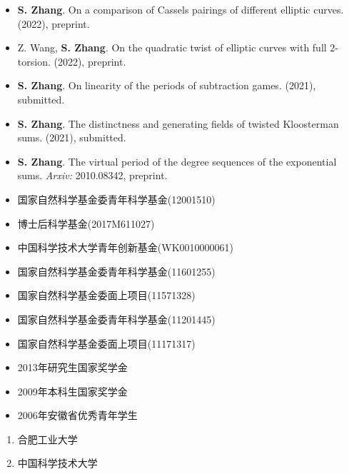 \documentclass[11pt,a4paper]{article}
\begin{document}
\begin{itemize}
\item \textbf{S. Zhang}.
On a comparison of Cassels pairings of different elliptic curves.
(2022), preprint.

\item Z. Wang, \textbf{S. Zhang}.
On the quadratic twist of elliptic curves with full $2$-torsion.
(2022), preprint.

\item \textbf{S. Zhang}.
On linearity of the periods of subtraction games.
(2021), submitted.

\item \textbf{S. Zhang}.
The distinctness and generating fields of twisted Kloosterman sums.
(2021), submitted.

\item \textbf{S. Zhang}.
The virtual period of the degree sequences of the exponential sums.
{\em Arxiv:} 2010.08342, preprint.
\end{itemize}


\begin{itemize}
\item 国家自然科学基金委青年科学基金(12001510)
\item 博士后科学基金(2017M611027)
\end{itemize}


\begin{itemize}
\item 中国科学技术大学青年创新基金(WK0010000061)
\item 国家自然科学基金委青年科学基金(11601255)
\item 国家自然科学基金委面上项目(11571328)
\item 国家自然科学基金委青年科学基金(11201445)
\item 国家自然科学基金委面上项目(11171317)
\end{itemize}


\begin{itemize}
\item 2013年研究生国家奖学金
\item 2009年本科生国家奖学金
\item 2006年安徽省优秀青年学生
\end{itemize}


\begin{enumerate}
\item 合肥工业大学
  \begin{enumerate}
  \end{enumerate}
\item 中国科学技术大学
  \begin{enumerate}
  \end{enumerate}
\end{enumerate}
\end{document}
